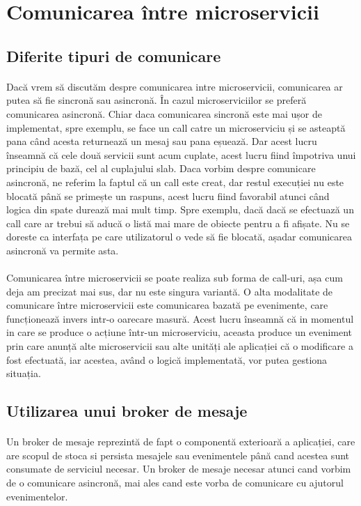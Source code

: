 \documentclass[12pt]{report}
\begin{document}
	\section{Comunicarea între microservicii}
		\subsection{Diferite tipuri de comunicare}
	\paragraph{}Dacă vrem să discutăm despre comunicarea intre microservicii, comunicarea ar putea să fie sincronă sau asincronă. În cazul microserviciilor se preferă comunicarea asincronă. Chiar daca comunicarea sincronă este mai ușor de implementat, spre exemplu, se face un call catre un microserviciu și se asteaptă pana când acesta returnează un mesaj sau pana eșuează. Dar acest lucru înseamnă că cele două servicii sunt acum cuplate, acest lucru fiind împotriva unui principiu de bază, cel al cuplajului slab. Daca vorbim despre comunicare asincronă, ne referim la faptul că un call este creat, dar restul execuției nu este blocată până se primește un raspuns, acest lucru fiind favorabil atunci când logica din spate durează mai mult timp. Spre exemplu, dacă dacă se efectuază un call care ar trebui să aducă o listă mai mare de obiecte pentru a fi afișate. Nu se doreste ca interfața pe care utilizatorul o vede să fie blocată, așadar comunicarea asincronă va permite asta.
	\paragraph{}Comunicarea între microservicii se poate realiza sub forma de call-uri, așa cum deja am precizat mai sus, dar nu este singura variantă. O alta modalitate de comunicare între microservicii este comunicarea bazată pe evenimente, care funcționează invers intr-o oarecare masură. Acest lucru înseamnă că in momentul in care se produce o acțiune într-un microserviciu, aceasta produce un eveniment prin care anunță alte microservicii sau alte unități ale aplicației că o modificare a fost efectuată, iar acestea, având o logică implementată, vor putea gestiona situația.
		\subsection{Utilizarea unui broker de mesaje}
	\paragraph{}Un broker de mesaje reprezintă de fapt o componentă exterioară a aplicației, care are scopul de stoca si persista mesajele sau evenimentele până cand acestea sunt consumate de serviciul necesar. Un broker de mesaje necesar atunci cand vorbim de o comunicare asincronă, mai ales cand este vorba de comunicare cu ajutorul evenimentelor.
\end{document}
